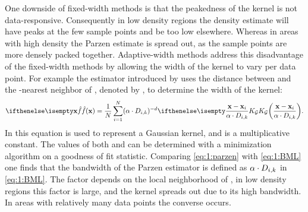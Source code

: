 	One downside of fixed-width methods is that the peakedness of the kernel is not data-responsive. Consequently in low density regions the density estimate will have peaks at the few sample points and be too low elsewhere. Whereas in areas with high density the Parzen estimate is spread out, as the sample points are more densely packed together\cite{breiman1977variable}. Adaptive-width methods address this disadvantage of the fixed-width methods by allowing the width of the kernel to vary per data point. For example the estimator introduced by \citeauthor{breiman1977variable} uses the distance between \varPattern[\itXis] and the \KNNK-nearest neighbor of \varPattern[\itXis], denoted by \varKNNDistance{\itXis}{\KNNK}, to determine the width of the kernel:
	\begin{equation}\label{eq:1:BML}
	 	\varEstimatedDensityFunction{\varPattern} = \frac{1}{\varNumPatterns} \sum_{\itXis = 1}^{\varNumPatterns} (\varBMLconstant \cdot \varKNNDistance{\itXis}{k})^{-\varDim} \varKernel[\varGaussian]{\frac{\varPattern - \varPattern[\itXis]}{\varBMLconstant \cdot \varKNNDistance{\itXis}{k}}}.
	\end{equation} 
	In this equation \varKernel[\varGaussian]{} is used to represent a Gaussian kernel, and \varBMLconstant is a multiplicative constant. The values of both \varBMLconstant and \KNNK can be determined with a minimization algorithm on a goodness of fit statistic. Comparing \cref{eq:1:parzen} with \eqref{eq:1:BML} one finds that the bandwidth \varBandwidth of the Parzen estimator is defined as $\alpha \cdot D_{i, k}$ in \cref{eq:1:BML}. The factor \varKNNDistance{\itXis}{\KNNK} depends on the local neighborhood of \varPattern[\itXis], in low density regions this factor is large, and the kernel spreads out due to its high bandwidth. In areas with relatively many data points the converse occurs.

